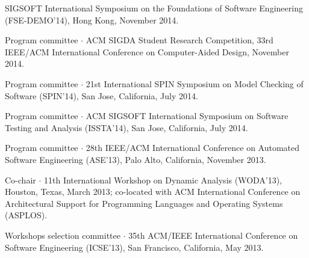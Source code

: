 \documentclass[ComputerScience]{vita}
\begin{document}
\begin{vita}
\begin{Panel and Committee Service}
  SIGSOFT International Symposium on the Foundations of Software
  Engineering (FSE-DEMO'14), Hong Kong, November 2014.
\item Program committee $\cdot$ ACM SIGDA Student Research Competition, 33rd IEEE/ACM International Conference on Computer-Aided Design, November 2014.
\item Program committee $\cdot$ 21st International SPIN Symposium on Model Checking of Software (SPIN'14), San Jose, California, July 2014.
\item Program committee $\cdot$ ACM SIGSOFT International Symposium on Software Testing and Analysis (ISSTA'14), San Jose, California, July 2014.
\item Program committee $\cdot$ 28th IEEE/ACM International Conference on Automated Software Engineering (ASE'13), Palo Alto, California, November 2013.
\item Co-chair $\cdot$ 11th International Workshop on Dynamic Analysis (WODA'13), Houston, Texas, March 2013; co-located with ACM International Conference on Architectural Support for Programming Languages and Operating Systems (ASPLOS).
\item Workshops selection committee $\cdot$ 35th ACM/IEEE International Conference on Software Engineering (ICSE'13), San Francisco, California, May 2013.

\end{Panel and Committee Service}
\end{vita}
\end{document}
